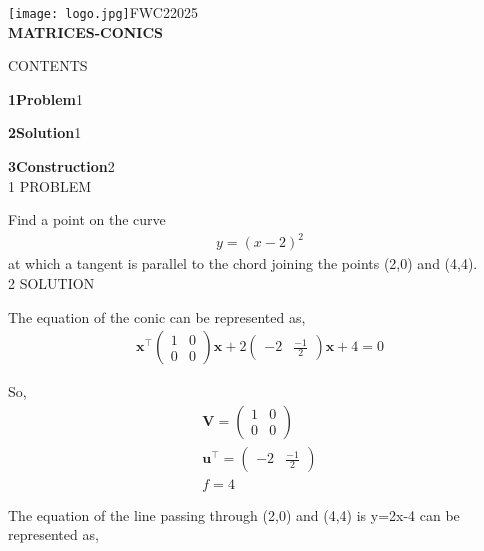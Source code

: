 \documentclass[a4paper,10pt]{report}
\newcommand{\myvec}[1]{\ensuremath{\begin{pmatrix}#1\end{pmatrix}}}
\let\vec\mathbf
\begin{document}
\raggedright{\texttt{[image: logo.jpg]}}\hspace{12.425cm}\raggedleft FWC22025\vspace{2mm}\\
\centering\Large\textbf{MATRICES-CONICS}\vspace{5mm}
\begin{multicols}{2}
\centering \large\textsc{C}\footnotesize\textsc{ONTENTS}\vspace{5mm}\\
\raggedright\large\textbf{1\hspace{1cm}Problem}\hspace{5.2cm}1\vspace{5mm}\\
\raggedright\large\textbf{2\hspace{1cm}Solution}\hspace{5.25cm}1\vspace{5mm}\\
\raggedright\large\textbf{3\hspace{1cm}Construction}\hspace{4.25cm}2\vspace{5mm}\\
\centering \large\textsc{1  P}\footnotesize\textsc{ROBLEM}\vspace{5mm}\\
\raggedright\large{Find a point on the curve \begin{align*}y=(x-2)^2\end{align*} at which a tangent is parallel to the chord joining the points (2,0) and (4,4).}\vspace{5mm}\\
\centering \large\textsc{2  S}\footnotesize\textsc{OLUTION}\vspace{5mm}\\
\raggedright\large{The equation of the conic can be represented as,}
\begin{align}
\vec{x}^{\top}\myvec{1&0\\0&0}\vec{x}+2\myvec{-2&\frac{-1}{2}}\vec{x}+4=0
\end{align}
\raggedright\large{So,}
\begin{gather*}
\vec{V}=\myvec{1&0\\0&0}\\
\vec{u}^{\top}=\myvec{-2&\frac{-1}{2}}\\
f=4
\end{gather*}
\raggedright\large{The equation of the line passing through (2,0) and (4,4) is y=2x-4 can be represented as,}\\

\end{multicols}
\end{document}
